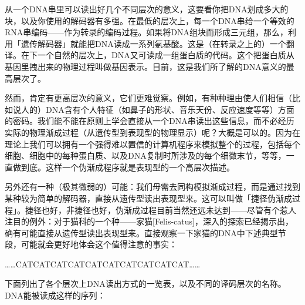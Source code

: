 \documentclass[
  12pt,
  twoside,
  openright,
  oldfontcommands,
]{memoir}
\begin{document}
从一个DNA串里可以读出好几个不同层次的意义，这要看你把DNA划成多大的块，以及你使用的解码器有多强。在最低的层次上，每一个DNA串给一个等效的RNA串编码------作为转录的编码过程。如果将DNA组块而形成三元组，那么，利用「遗传解码器」就能把DNA读成一系列氨基酸。这是（在转录之上的）一个翻译。在下一个自然的层次上，DNA又可读成一组蛋白质的代码。这个把蛋白质从基因里拽出来的物理过程叫做基因表示。目前，这是我们所了解的DNA意义的最高层次了。

然而，肯定有更高层次的意义，它们更难觉察。例如，有种种理由使人们相信（比如说人的）DNA含有个人特征（如鼻子的形状、音乐天份、反应速度等等）方面的密码。我们能不能在原则上学会直接从一个DNA串读出这些信息，而不必经历实际的物理渐成过程（从遗传型到表现型的物理显示）呢？大概是可以的。因为在理论上我们可以拥有一个强得难以置信的计算机程序来模拟整个的过程，包括每个细胞、细胞中的每种蛋白质、以及DNA复制时所涉及的每个细微末节，等等，一直做到底。这样一个伪渐成程序就是表现型的一个高层次描述。

另外还有一种（极其微弱的）可能：我们毋需去同构模拟渐成过程，而是通过找到某种较为简单的解码器，直接从遗传型读出表现型来。这可以叫做「捷径伪渐成过程」。捷径也好，非捷径也好，伪渐成过程目前当然还远未达到------尽管有个惹人注目的例外：对于猫科的一个种------家猫{[}Felis-catus{]}，深入的探索已经揭示出，确有可能直接从遗传型读出表现型来。直接观察一下家猫的DNA中下述典型节段，可能就会更好地体会这个值得注意的事实：

\ldots\ldots CATCATCATCATCATCATCATCATCATCAT\ldots\ldots{}

下面列出了各个层次上DNA读出方式的一览表，以及不同的译码层次的名称。DNA能被读成这样的序列：

\end{document}
